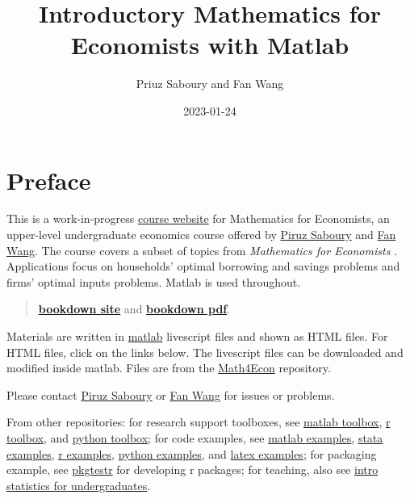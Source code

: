 \documentclass[
]{book}
\title{Introductory Mathematics for Economists with Matlab}
\author{Priuz Saboury and Fan Wang}
\date{2023-01-24}
\begin{document}
\maketitle

{
\hypersetup{linkcolor=}
\setcounter{tocdepth}{1}
\tableofcontents
}
\hypertarget{preface}{%
\chapter*{Preface}\label{preface}}

This is a work-in-progress \href{http://math4econ.github.io/}{course website} for Mathematics for Economists, an upper-level undergraduate economics course offered by \href{https://piruzsaboury.weebly.com/}{Piruz Saboury} and \href{https://fanwangecon.github.io/}{Fan Wang}. The course covers a subset of topics from \emph{Mathematics for Economists} \citep{simonblume1994}. Applications focus on households' optimal borrowing and savings problems and firms' optimal inputs problems. Matlab is used throughout.

\begin{quote}
\href{https://Math4Econ.github.io/bookdown}{\textbf{bookdown site}} and \href{https://Math4econ.github.io/bookdown/Introductory-Mathematics-for-Economists-with-Matlab.pdf}{\textbf{bookdown pdf}}.
\end{quote}

Materials are written in \href{https://www.mathworks.com/products/matlab.html}{matlab} \citep{matlab} livescript files and shown as HTML files. For HTML files, click on the links below. The livescript files can be downloaded and modified inside matlab. Files are from the \href{https://github.com/Math4Econ/Math4Econ.github.io}{Math4Econ} repository.

Please contact \href{https://piruzsaboury.weebly.com/}{Piruz Saboury} or \href{https://fanwangecon.github.io/}{Fan Wang} for issues or problems.

From other repositories: for research support toolboxes, see \href{https://fanwangecon.github.io/mecontools/}{matlab toolbox}, \href{https://fanwangecon.github.io/recontools/}{r toolbox}, and \href{https://pyfan.readthedocs.io/en/latest/}{python toolbox}; for code examples, see \href{https://fanwangecon.github.io/m4econ/}{matlab examples}, \href{https://fanwangecon.github.io/stata4econ/}{stata examples}, \href{https://fanwangecon.github.io/r4econ/}{r examples}, \href{https://fanwangecon.github.io/py4econ/}{python examples}, and \href{https://fanwangecon.github.io/tex4econ/}{latex examples}; for packaging example, see \href{http://fanwangecon.github.io/pkgtestr}{pkgtestr} for developing r packages; for teaching, also see \href{https://fanwangecon.github.io/stat4econ/}{intro statistics for undergraduates}.
\end{document}

